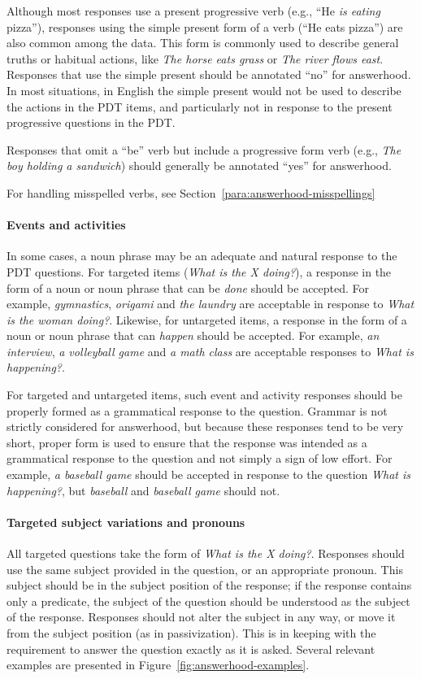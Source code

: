 \documentclass[12pt,notitlepage]{article}
\begin{document}
Although most responses use a present progressive  verb (e.g., ``He \textit{is eating} pizza''), responses using the simple present form of a verb (``He eats pizza'') are also common among the data. This form is commonly used to describe general truths or habitual actions, like \textit{The horse eats grass} or \textit{The river flows east}. Responses that use the simple present should be annotated ``no'' for answerhood. In most situations, in English the simple present would not be used to describe the actions in the PDT items, and particularly not in response to the present progressive questions in the PDT.

Responses that omit a ``be'' verb but include a progressive form verb (e.g., \textit{The boy holding a sandwich}) should generally be annotated ``yes'' for answerhood.

For handling misspelled verbs, see Section~\ref{para:answerhood-misspellings}

\paragraph{Events and activities}
\label{para:answerhood-events}
In some cases, a noun phrase may be an adequate and natural response to the PDT questions. For targeted items (\textit{What is the X doing?}), a response in the form of a noun or noun phrase that can be \textit{done} should be accepted. For example, \textit{gymnastics}, \textit{origami} and \textit{the laundry} are acceptable in response to \textit{What is the woman doing?}. Likewise, for untargeted items, a response in the form of a noun or noun phrase that can \textit{happen} should be accepted. For example, \textit{an interview}, \textit{a volleyball game} and \textit{a math class} are acceptable responses to \textit{What is happening?}.

For targeted and untargeted items, such event and activity responses should be properly formed as a grammatical response to the question. Grammar is not strictly considered for answerhood, but because these responses tend to be very short, proper form is used to ensure that the response was intended as a grammatical response to the question and not simply a sign of low effort. For example, \textit{a baseball game} should be accepted in response to the question \textit{What is happening?}, but \textit{baseball} and \textit{baseball game} should not.

\paragraph{Targeted subject variations and pronouns}
All targeted questions take the form of \textit{What is the X doing?}. Responses should use the same subject provided in the question, or an appropriate pronoun. This subject should be in the subject position of the response; if the response contains only a predicate, the subject of the question should be understood as the subject of the response. Responses should not alter the subject in any way, or move it from the subject position (as in passivization). This is in keeping with the requirement to answer the question exactly as it is asked. Several relevant examples are presented in Figure~\ref{fig:answerhood-examples}.
\end{document}
